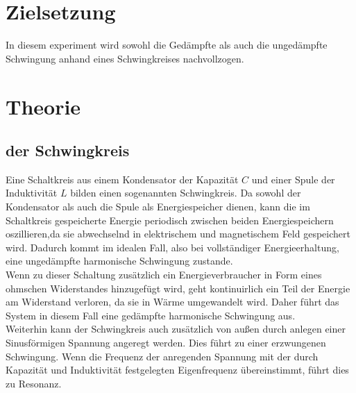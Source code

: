\section{Zielsetzung}
In diesem experiment wird sowohl die Gedämpfte als auch die ungedämpfte Schwingung anhand eines Schwingkreises 
nachvollzogen.
\section{Theorie}
\subsection{der Schwingkreis}
Eine Schaltkreis aus einem Kondensator der Kapazität $C$ und einer Spule der Induktivität $L$ bilden einen sogenannten 
Schwingkreis. Da sowohl der Kondensator als auch die Spule als Energiespeicher dienen, kann die im Schaltkreis gespeicherte Energie periodisch zwischen beiden Energiespeichern oszillieren,da sie abwechselnd in elektrischem und magnetischem Feld gespeichert wird. Dadurch kommt im idealen Fall, also bei vollständiger Energieerhaltung, eine ungedämpfte harmonische Schwingung zustande.\\ Wenn zu dieser Schaltung zusätzlich ein Energieverbraucher in Form eines ohmschen Widerstandes hinzugefügt wird, geht kontinuirlich ein Teil der Energie am Widerstand verloren, da sie in Wärme umgewandelt wird. Daher führt das System in diesem Fall eine gedämpfte harmonische Schwingung aus. \\
Weiterhin kann der Schwingkreis auch zusätzlich von außen durch anlegen einer Sinusförmigen Spannung angeregt werden. Dies führt zu einer erzwungenen Schwingung. Wenn die Frequenz der anregenden Spannung mit der durch Kapazität und Induktivität festgelegten Eigenfrequenz übereinstimmt, führt dies zu Resonanz.
